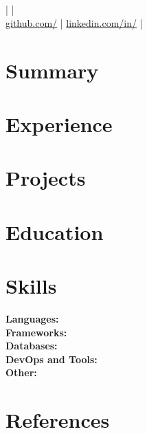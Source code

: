 \documentclass[10pt,a4paper]{article}
\begin{document}
\begin{center}
  {\LARGE\bfseries\color{accent} \cvName}\\[2pt]
  {\color{muted}\cvTitle}\\[3pt]
  \small \cvEmail{} | \cvPhone{} | \cvLocation\\
  \href{https://github.com/\cvGithub}{github.com/\cvGithub} |
  \href{https://linkedin.com/in/\cvLinkedin}{linkedin.com/in/\cvLinkedin} |
  \href{https://\cvPortfolio}{\cvPortfolio}
\end{center}

\section{Summary}
{\raggedright\cvSummary\par}

\section{Experience}
\cvExperience

\section{Projects}
\cvProjects

\section{Education}
\cvEducation

\section{Skills}
\textbf{Languages:} \cvSkillLang\\
\textbf{Frameworks:} \cvSkillFw\\
\textbf{Databases:} \cvSkillDb\\
\textbf{DevOps and Tools:} \cvSkillOps\\
\textbf{Other:} \cvSkillOther

\section{References}
\begin{minipage}[t]{0.5\linewidth}
\cvRefereeA
\end{minipage}%
\begin{minipage}[t]{0.5\linewidth}
\cvRefereeB
\end{minipage}
\end{document}
